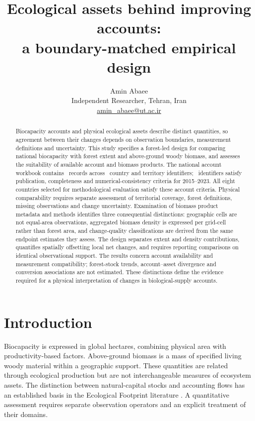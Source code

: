 \documentclass[11pt,a4paper]{article}
\title{Ecological assets behind improving accounts:\\a boundary-matched empirical design}
\author{Amin Abaee\\\small Independent Researcher, Tehran, Iran\\\small\href{mailto:amin_abaee@ut.ac.ir}{amin\_abaee@ut.ac.ir}}
\date{}
\begin{document}
\maketitle
\begin{abstract}
Biocapacity accounts and physical ecological assets describe distinct quantities, so agreement between their changes depends on observation boundaries, measurement definitions and uncertainty. This study specifies a forest-led design for comparing national biocapacity with forest extent and above-ground woody biomass, and assesses the suitability of available account and biomass products. The national account workbook contains \NationalRows\ records across \CountryIDs\ country and territory identifiers; \AccountPass\ identifiers satisfy publication, completeness and numerical-consistency criteria for 2015--2023. All eight countries selected for methodological evaluation satisfy these account criteria. Physical comparability requires separate assessment of territorial coverage, forest definitions, missing observations and change uncertainty. Examination of biomass product metadata and methods identifies three consequential distinctions: geographic cells are not equal-area observations, aggregated biomass density is expressed per grid-cell rather than forest area, and change-quality classifications are derived from the same endpoint estimates they assess. The design separates extent and density contributions, quantifies spatially offsetting local net changes, and requires reporting comparisons on identical observational support. The results concern account availability and measurement compatibility; forest-stock trends, account--asset divergence and conversion associations are not estimated. These distinctions define the evidence required for a physical interpretation of changes in biological-supply accounts.
\end{abstract}

\section{Introduction}
Biocapacity is expressed in global hectares, combining physical area with productivity-based factors. Above-ground biomass is a mass of specified living woody material within a geographic support. These quantities are related through ecological production but are not interchangeable measures of ecosystem assets. The distinction between natural-capital stocks and accounting flows has an established basis in the Ecological Footprint literature \citep{Mancini2017}. A quantitative assessment requires separate observation operators and an explicit treatment of their domains.
\end{document}

